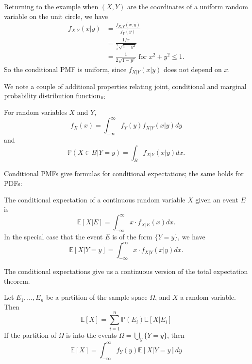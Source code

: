 \documentclass{ximera}
\begin{document}
Returning to the example when $(X,Y)$ are the coordinates of a uniform random variable on the unit circle, we have
\begin{align*}
f_{X \vert Y}(x \vert y) &= \frac{f_{X,Y}(x,y)}{f_Y(y)} \\
&= \frac{1/\pi}{\tfrac{2}{\pi}\sqrt{1-y^2}}\\
&= \frac{1}{2 \sqrt{1-y^2}} \text{ for } x^2 + y^2 \leq 1.
\end{align*}
So the conditional PMF is uniform, since $f_{X \vert Y}(x \vert y)$ does not depend on $x$.

We note a couple of additional properties relating joint, conditional and marginal $\text{probability distribution function}$s:
\begin{theorem} 
For random variables $X$ and $Y$,
$$
f_{X}(x)=\int_{-\infty}^{\infty} f_{Y}(y) f_{X | Y}(x | y) d y
$$
and
$$
\mathbb{P}(X \in B | Y=y)=\int_{B} f_{X | Y}(x | y) d x.
$$
\end{theorem}

Conditional PMFs give formulas for conditional expectations; the same holds for PDFs:
\begin{definition}
The conditional expectation of a continuous random variable $X$ given an event $E$ is
$$
\mathbb{E}[X \vert E] = \int_{-\infty}^{\infty} x \cdot f_{X \vert E}(x)dx.
$$
In the special case that the event $E$ is of the form $ \{Y=y\}$, we have
$$
\mathbb{E}[X \vert Y=y] = \int_{-\infty}^{\infty} x \cdot f_{X \vert Y}(x \vert y)dx.
$$
\end{definition}

The conditional expectations give us a continuous version of the total expectation theorem.
\begin{theorem}
Let $E_1,\ldots,E_n$ be a partition of the sample space $\Omega$, and $X$ a random variable. Then
$$
\mathbb{E}[X]=\sum_{i=1}^{n} \mathbb{P}\left(E_{i}\right) \mathbb{E}\left[X | E_{i}\right]
$$
If the partition of $\Omega$ is into the events $\Omega = \bigcup_y \{Y=y\}$, then 
$$
\mathbb{E}[X]=\int_{-\infty}^{\infty} f_{Y}(y)  \mathbb{E}[X | Y=y] d y
$$
\end{theorem}
\end{document}
